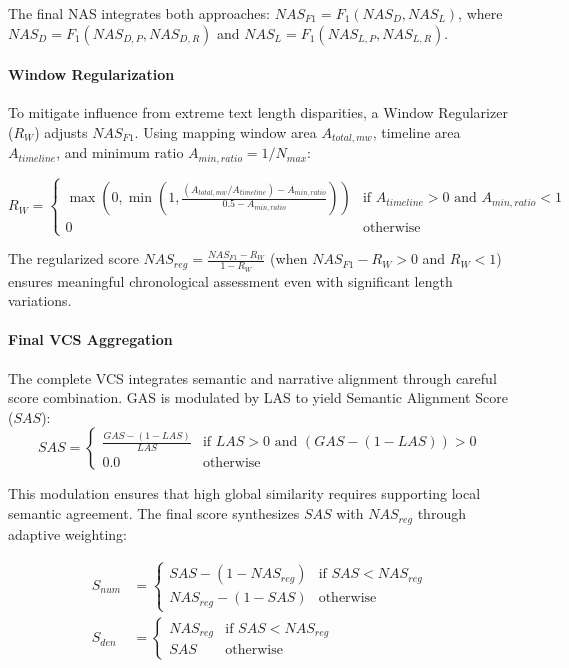 \documentclass[letterpaper]{article} %
\begin{document}
The final NAS integrates both approaches: $NAS_{F1} = F_1(NAS_D, NAS_L)$, where $NAS_D = F_1(NAS_{D,P}, NAS_{D,R})$ and $NAS_L = F_1(NAS_{L,P}, NAS_{L,R})$.

\paragraph{Window Regularization}
To mitigate influence from extreme text length disparities, a Window Regularizer ($R_W$) adjusts $NAS_{F1}$. Using mapping window area $A_{total,mw}$, timeline area $A_{timeline}$, and minimum ratio $A_{min,ratio} = 1/N_{max}$:

\begin{equation}
R_W = 
\begin{cases}
\max\left(0, \min\left(1, \frac{(A_{total,mw} / A_{timeline}) - A_{min,ratio}}{0.5 - A_{min,ratio}}\right)\right) & \text{if } A_{timeline} > 0 \text{ and } A_{min,ratio} < 1 \\
0 & \text{otherwise}
\end{cases}
\end{equation}

The regularized score $NAS_{reg} = \frac{NAS_{F1} - R_W}{1 - R_W}$ (when $NAS_{F1} - R_W > 0$ and $R_W < 1$) ensures meaningful chronological assessment even with significant length variations.

\paragraph{Final VCS Aggregation}
The complete VCS integrates semantic and narrative alignment through careful score combination. GAS is modulated by LAS to yield Semantic Alignment Score ($SAS$):
\begin{equation} \label{eq:sas_revised} 
SAS = 
\begin{cases}
\frac{GAS - (1 - LAS)}{LAS} & \text{if } LAS > 0 \text{ and } (GAS - (1 - LAS)) > 0 \\
0.0 & \text{otherwise}
\end{cases}
\end{equation}

This modulation ensures that high global similarity requires supporting local semantic agreement. The final score synthesizes $SAS$ with $NAS_{reg}$ through adaptive weighting:

\begin{align}
S_{num} &= 
\begin{cases}
SAS - (1 - NAS_{reg}) & \text{if } SAS < NAS_{reg} \\
NAS_{reg} - (1 - SAS) & \text{otherwise}
\end{cases} \\
S_{den} &= 
\begin{cases}
NAS_{reg} & \text{if } SAS < NAS_{reg} \\
SAS & \text{otherwise}
\end{cases}
\end{align}
\end{document}
